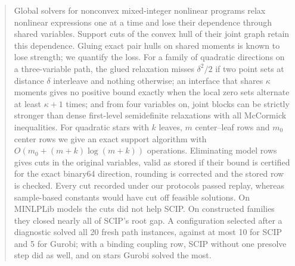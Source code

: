 \begin{abstract}
Global solvers for nonconvex mixed-integer nonlinear programs relax nonlinear
expressions one at a time and lose their dependence through shared variables.
Support cuts of the convex hull of their joint graph retain this dependence.
Gluing exact pair hulls on shared moments is known to lose strength; we
quantify the loss. For a family of quadratic directions on a three-variable
path, the glued relaxation misses $\delta^2/2$ if two point sets at distance
$\delta$ interleave and nothing otherwise; an interface that shares $\kappa$
moments gives no positive bound exactly when the local zero sets alternate at
least $\kappa+1$ times; and from four variables on, joint blocks can be
strictly stronger than dense first-level semidefinite relaxations with all
McCormick inequalities. For quadratic stars with $k$ leaves, $m$ center--leaf
rows and $m_0$ center rows we give an exact support algorithm with
$O(m_0+(m+k)\log(m+k))$ operations. Eliminating model rows gives cuts in the
original variables, valid as stored if their bound is certified for the exact
binary64 direction, rounding is corrected and the stored row is checked. Every
cut recorded under our protocols passed replay, whereas sample-based constants
would have cut off feasible solutions. On MINLPLib models the cuts did not
help SCIP. On constructed families they closed nearly all of SCIP's root gap.
A configuration selected after a diagnostic solved all 20 fresh path
instances, against at most 10 for SCIP and 5 for Gurobi; with a binding
coupling row, SCIP without one presolve step did as well, and on stars Gurobi
solved the most.
\end{abstract}
